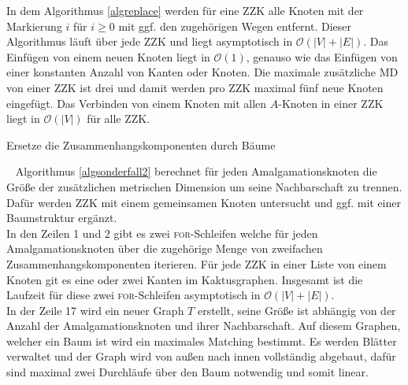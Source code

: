 In dem Algorithmus \ref{algreplace} werden für eine ZZK alle Knoten mit der Markierung $i$ für $i \geq 0$ mit ggf. den zugehörigen Wegen entfernt. Dieser Algorithmus läuft über jede ZZK und liegt asymptotisch in $\mathcal{O}(|V|+|E|)$.
Das Einfügen von einem neuen Knoten liegt in $\mathcal{O}(1)$, genauso wie das Einfügen von einer konstanten Anzahl von Kanten oder Knoten. Die maximale zusätzliche MD von einer ZZK ist drei und damit werden pro ZZK maximal fünf neue Knoten eingefügt. Das Verbinden von einem Knoten mit allen $A$-Knoten in einer ZZK liegt in $\mathcal{O}(|V|)$ für alle ZZK.\\
\vspace{-7mm}
\begin{algorithm}
\caption{Ersetze die Zusammenhangskomponenten durch Bäume}
\begin{algorithmic}[1]
\vspace{2mm}
\ENDFOR
\vspace{2mm}
\end{algorithmic}
\label{algreplace}
\end{algorithm}
\vspace{-4mm}
~\linebreak
Algorithmus \ref{algsonderfall2} berechnet für jeden Amalgamationsknoten die Größe der zusätzlichen metrischen Dimension um seine Nachbarschaft zu trennen. Dafür werden ZZK mit einem gemeinsamen Knoten untersucht und ggf. mit einer Baumstruktur ergänzt.\\ %
In den Zeilen 1 und 2 gibt es zwei \textsc{for}-Schleifen welche für jeden Amalgamationsknoten über die zugehörige Menge von zweifachen Zusammenhangskomponenten iterieren. Für jede ZZK in einer Liste von einem Knoten git es eine oder zwei Kanten im Kaktusgraphen. Insgesamt ist die Laufzeit für diese zwei \textsc{for}-Schleifen asymptotisch in $\mathcal{O}(|V|+|E|)$.\\
In der Zeile 17 wird ein neuer Graph $T$ erstellt, seine Größe ist abhängig von der Anzahl der Amalgamationsknoten und ihrer Nachbarschaft. Auf diesem Graphen, welcher ein Baum ist wird ein maximales Matching bestimmt. Es werden Blätter verwaltet und der Graph wird von außen nach innen vollständig abgebaut, dafür sind maximal zwei Durchläufe über den Baum notwendig und somit linear.\\
